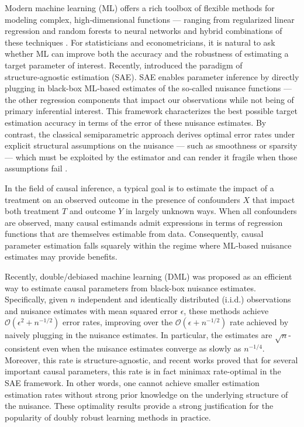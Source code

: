 \documentclass{article}
\def\eps{{\epsilon}}
\def\gO{{\mathcal{O}}}
\begin{document}
Modern machine learning (ML) offers a rich toolbox of flexible methods for modeling complex, high‑dimensional functions --- ranging from regularized linear regression \citep{belloni2014pivotal,zou2005regularization} and random forests \citep{breiman2001random,biau2008consistency,syrgkanis2020estimation} to neural networks \citep{schmidt2020nonparametric,farrell2021deep} and hybrid combinations of these techniques \citep{dvzeroski2004combining,chernozhukov2022automatic}. For statisticians and econometricians, it is natural to ask whether ML can improve both the accuracy and the robustness of estimating a target parameter of interest. Recently, \citet{balakrishnan2023fundamental} introduced the paradigm of structure‑agnostic estimation (SAE). 
SAE enables parameter inference by directly plugging in black-box ML‑based estimates of the so‑called nuisance functions --- 
the other regression components that impact our observations while not being of primary inferential interest. 
%
This framework characterizes the best possible target estimation accuracy in terms of the error of these nuisance estimates. By contrast, the classical semiparametric approach derives optimal error rates under explicit structural assumptions on the nuisance --- such as smoothness or sparsity --- which must be exploited by the estimator and can render it fragile when those assumptions fail \citep{stone1982optimal,chen1999improved,belloni2011inference}.

In the field of causal inference, a typical goal is to estimate the impact of a treatment on an observed outcome in the presence of confounders $X$ that impact both treatment $T$ and outcome $Y$ in largely unknown ways. 
%
%
When all confounders are observed, many causal estimands admit expressions in terms of regression functions that are themselves estimable from data. Consequently, causal parameter estimation falls squarely within the regime where ML‑based nuisance estimates may provide benefits.

Recently, double/debiased machine learning (DML) \citep{chernozhukov2018double,chernozhukov2022automatic} 
%
was proposed as an efficient way to estimate causal parameters from black-box nuisance estimates. Specifically, given $n$ independent and identically distributed (i.i.d.) observations and nuisance estimates with mean squared error $\eps$, these methods achieve $\gO(\eps^2+n^{-1/2})$ error rates, improving over the $\gO(\eps+n^{-1/2})$ rate achieved by naively plugging in the nuisance estimates. In particular, the estimates are $\sqrt{n}$-consistent even when the nuisance estimates converge as slowly as $n^{-1/4}$. Moreover, this rate is structure-agnostic, and recent works \citep{balakrishnan2023fundamental,jin2024structure} proved that for several important causal parameters, this rate is in fact minimax rate-optimal in the SAE framework. In other words, 
%
one cannot achieve smaller estimation estimation rates without strong prior knowledge on the underlying structure of the nuisance. These optimality results provide a strong justification for the popularity of doubly robust learning methods in practice.
\end{document}
